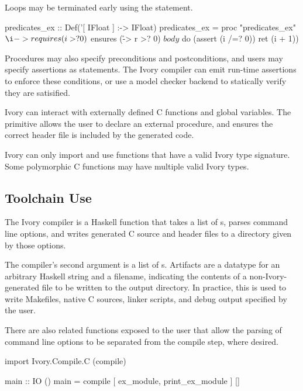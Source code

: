 Loops may be terminated early using the  statement.

\begin{code}
predicates_ex :: Def('[ IFloat ] :-> IFloat)
predicates_ex = proc "predicates_ex" $
    \i -> requires (i >? 0)
        $ ensures (\r -> r >? 0)
        $ body
        $ do (assert (i /=? 0))
             ret (i + 1))
\end{code}

Procedures may also specify preconditions and postconditions, and users may
specify assertions as statements. The Ivory compiler can emit run-time
assertions to enforce these conditions, or use a model checker backend to
statically verify they are satisified.


Ivory can interact with externally defined C functions and global
variables. The  primitive allows the user to declare an external
procedure, and ensures the correct header file is included by the generated
code.

Ivory can only import and use functions that have a valid Ivory type signature.
Some polymorphic C functions may have multiple valid Ivory types.

\subsection{Toolchain Use}
The Ivory compiler is a Haskell function that takes a list of s,
parses command line options, and writes generated C source and header files to
a directory given by those options.

The compiler's second argument is a list of s. Artifacts are a
datatype for an arbitrary Haskell string and a filename, indicating the contents
of a non-Ivory-generated file to be written to the output directory. In
practice, this is used to write Makefiles, native C sources, linker scripts, and debug output
specified by the user.

There are also related functions exposed to the user that allow the parsing
of command line options to be separated from the compile step, where desired.

\begin{code}
import Ivory.Compile.C (compile)

main :: IO ()
main = compile [ ex_module, print_ex_module ] []
\end{code}






